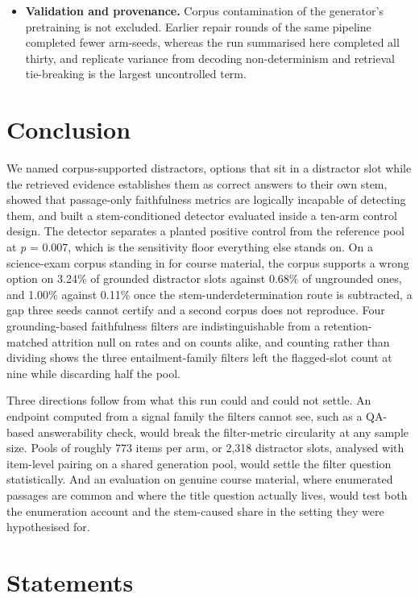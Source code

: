 \documentclass[11pt]{article}
\begin{document}
\begin{itemize}
\item \textbf{Validation and provenance.} Corpus contamination of the generator's pretraining is not excluded. Earlier repair rounds of the same pipeline completed fewer arm-seeds, whereas the run summarised here completed all thirty, and replicate variance from decoding non-determinism and retrieval tie-breaking is the largest uncontrolled term.
\end{itemize}

\section{Conclusion}

We named corpus-supported distractors, options that sit in a distractor slot while the retrieved evidence establishes them as correct answers to their own stem, showed that passage-only faithfulness metrics are logically incapable of detecting them, and built a stem-conditioned detector evaluated inside a ten-arm control design. The detector separates a planted positive control from the reference pool at \emph{p} = 0.007, which is the sensitivity floor everything else stands on. On a science-exam corpus standing in for course material, the corpus supports a wrong option on 3.24\% of grounded distractor slots against 0.68\% of ungrounded ones, and 1.00\% against 0.11\% once the stem-underdetermination route is subtracted, a gap three seeds cannot certify and a second corpus does not reproduce. Four grounding-based faithfulness filters are indistinguishable from a retention-matched attrition null on rates and on counts alike, and counting rather than dividing shows the three entailment-family filters left the flagged-slot count at nine while discarding half the pool.

Three directions follow from what this run could and could not settle. An endpoint computed from a signal family the filters cannot see, such as a QA-based answerability check, would break the filter-metric circularity at any sample size. Pools of roughly 773 items per arm, or 2,318 distractor slots, analysed with item-level pairing on a shared generation pool, would settle the filter question statistically. And an evaluation on genuine course material, where enumerated passages are common and where the title question actually lives, would test both the enumeration account and the stem-caused share in the setting they were hypothesised for.

\section{Statements}
\end{document}
